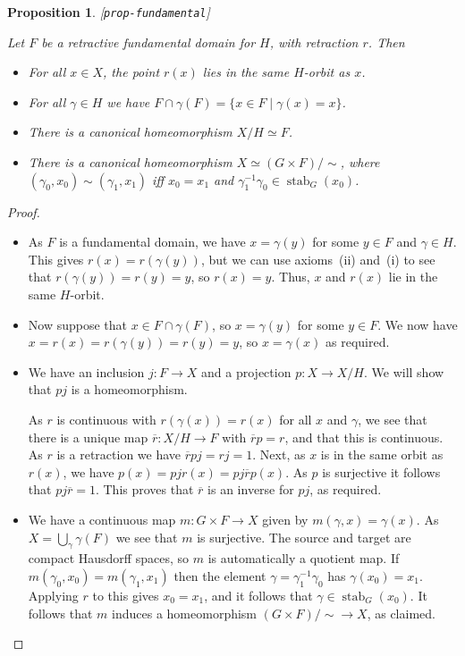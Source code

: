 \documentclass[reqno]{amsart}
\newcommand{\lbl}[1]{\label{#1}\textup{[\texttt{#1}]}\par}
\newcommand{\lbl}{\label}
\newcommand{\stab}	{\operatorname{stab}}
\newcommand{\gm}        {\gamma}
\newcommand{\ov}[1]     {\overline{#1}}
\newcommand{\st}        {\;|\;}
\newcommand{\tm}        {\times}
\renewcommand{\:}{\colon}
\newtheorem{proposition}[theorem]{Proposition}
\theoremstyle{definition}
\begin{document}
\begin{proposition}\lbl{prop-fundamental}
 Let $F$ be a retractive fundamental domain for $H$, with retraction $r$.
 Then
 \begin{itemize}
  \item[(a)] For all $x\in X$, the point $r(x)$ lies in the same
   $H$-orbit as $x$.
  \item[(b)] For all $\gm\in H$ we have
   $F\cap\gm(F)=\{x\in F\st \gm(x)=x\}$.
  \item[(c)] There is a canonical homeomorphism $X/H\simeq F$.
  \item[(d)] There is a canonical homeomorphism
   $X\simeq(G\tm F)/\sim$, where $(\gm_0,x_0)\sim(\gm_1,x_1)$ iff
   $x_0=x_1$ and $\gm_1^{-1}\gm_0\in\stab_G(x_0)$.
 \end{itemize}
\end{proposition}
\begin{proof}
 \begin{itemize}
  \item[(a)] As $F$ is a fundamental domain, we have $x=\gm(y)$ for
   some $y\in F$ and $\gm\in H$.  This gives $r(x)=r(\gm(y))$, but we
   can use axioms~(ii) and~(i) to see that $r(\gm(y))=r(y)=y$, so
   $r(x)=y$.  Thus, $x$ and $r(x)$ lie in the same $H$-orbit.
  \item[(b)] Now suppose that $x\in F\cap\gm(F)$, so $x=\gm(y)$ for
   some $y\in F$.  We now have $x=r(x)=r(\gm(y))=r(y)=y$, so
   $x=\gm(x)$ as required.
  \item[(c)] We have an inclusion $j\:F\to X$ and a projection
   $p\:X\to X/H$.  We will show that $pj$ is a homeomorphism.

   As $r$ is continuous with $r(\gm(x))=r(x)$ for all $x$ and $\gm$,
   we see that there is a unique map $\ov{r}\:X/H\to F$ with
   $\ov{r}p=r$, and that this is continuous.  As $r$ is a retraction
   we have $\ov{r}pj=rj=1$.  Next, as $x$ is in the same orbit as
   $r(x)$, we have $p(x)=pjr(x)=pj\ov{r}p(x)$.  As $p$ is surjective
   it follows that $pj\ov{r}=1$.  This proves that $\ov{r}$ is an
   inverse for $pj$, as required.
  \item[(d)] We have a continuous map $m\:G\tm F\to X$ given by
   $m(\gm,x)=\gm(x)$.  As $X=\bigcup_\gm\gm(F)$ we see that $m$ is
   surjective.  The source and target are compact Hausdorff spaces, so
   $m$ is automatically a quotient map.  If
   $m(\gm_0,x_0)=m(\gm_1,x_1)$ then the element $\gm=\gm_1^{-1}\gm_0$
   has $\gm(x_0)=x_1$.  Applying $r$ to this gives $x_0=x_1$, and it
   follows that $\gm\in\stab_G(x_0)$.  It follows that $m$ induces a
   homeomorphism $(G\tm F)/\sim\to X$, as claimed.
 \end{itemize}
\end{proof}
\end{document}
